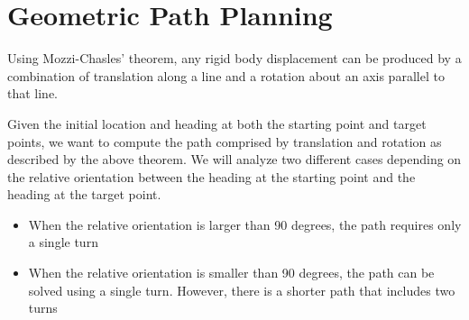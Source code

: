 \documentclass{article}
\newcommand{\Wheel}[3]{
  \begin{scope}[shift={#1},rotate=#2]
    \draw[rounded corners=9,#3] (-1,-5) rectangle (1,5);
  \end{scope}
}
\begin{document}
\bigskip
{}


\section*{Geometric Path Planning}

Using Mozzi-Chasles' theorem, any rigid body displacement can be produced by a combination of
translation along a line and a rotation about an axis parallel to that line.

Given the initial location and heading at both the starting point and target points,
we want to compute the path comprised by translation and rotation as described by 
the above theorem.
We will analyze two different cases depending on the relative orientation between the heading
at the starting point and the heading at the target point.

\begin{itemize}
  \item When the relative orientation is larger than 90 degrees, the path requires
  only a single turn
  \item When the relative orientation is smaller than 90 degrees, the path can be solved
  using a single turn. However, there is a shorter path that includes two turns
\end{itemize}
\end{document}
